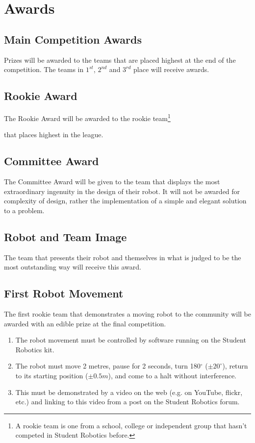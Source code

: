 \section {Awards}
\label{sec:Awards}

\subsection{Main Competition Awards}
Prizes will be awarded to the teams that are placed highest at the end of the competition.
The teams in $1^{st}$, $2^{nd}$ and $3^{rd}$ place will receive awards.

\subsection{Rookie Award}
The Rookie Award will be awarded to the rookie
team\footnote{A rookie team is one from a school, college or independent group that hasn't competed in Student Robotics before.}\addtocounter{footnote}{-1}\addtocounter{Hfootnote}{-1}
 that places highest in the league.

\subsection{Committee Award}
The Committee Award will be given to the team that displays the most extraordinary ingenuity in the design of their robot.
It will not be awarded for complexity of design, rather the implementation of a simple and elegant solution to a problem.

\subsection{Robot and Team Image}
The team that presents their robot and themselves in what is judged to be the most outstanding way will receive this award.

\subsection{First Robot Movement}
The first rookie team\footnotemark{} that demonstrates a moving robot to the community will be awarded with an edible prize at the final competition.
\begin{enumerate}
\item The robot movement must be controlled by software running on the Student Robotics kit.
\item The robot must move 2 metres, pause for 2 seconds, turn 180$^\circ$ ($\pm20^\circ$), return to its starting position ($\pm0.5m$), and come to a halt without interference.
\item This must be demonstrated by a video on the web (e.g. on YouTube, flickr, etc.) and linking to this video from a post on the Student Robotics forum.
\end{enumerate}

